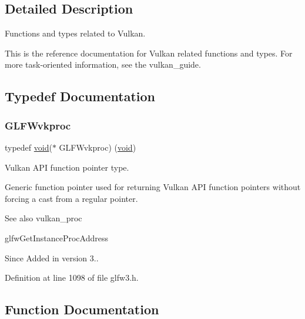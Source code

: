 \subsection{Detailed Description}
Functions and types related to Vulkan. 

This is the reference documentation for Vulkan related functions and types. For more task-\/oriented information, see the vulkan\+\_\+guide. 

\subsection{Typedef Documentation}
\mbox{\label{group__vulkan_ga70c01918dc9d233a4fbe0681a43018af}} 
\subsubsection{\texorpdfstring{GLFWvkproc}{GLFWvkproc}}
{\footnotesize\ttfamily typedef \mbox{\hyperlink{glad_8h_a950fc91edb4504f62f1c577bf4727c29}{void}}($\ast$ G\+L\+F\+Wvkproc) (\mbox{\hyperlink{glad_8h_a950fc91edb4504f62f1c577bf4727c29}{void}})}



Vulkan A\+PI function pointer type. 

Generic function pointer used for returning Vulkan A\+PI function pointers without forcing a cast from a regular pointer.

\begin{DoxySeeAlso}{See also}
vulkan\+\_\+proc 

glfw\+Get\+Instance\+Proc\+Address
\end{DoxySeeAlso}
\begin{DoxySince}{Since}
Added in version 3.. 
\end{DoxySince}


Definition at line 1098 of file glfw3.\+h.



\subsection{Function Documentation}
\mbox{\label{group__vulkan_ga70adaf0cfc99adc484c49ea99e17c2cf}} 
